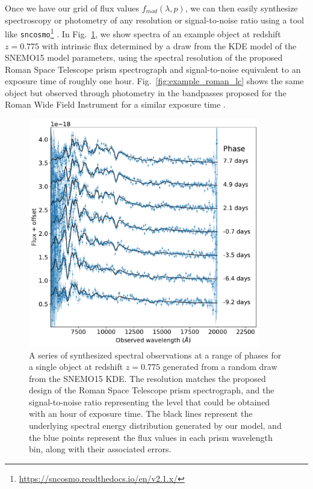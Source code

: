 Once we have our grid of flux values $f_{mod}(\lambda, p)$, we can then easily synthesize spectroscopy or photometry of any resolution or signal-to-noise ratio using a tool like \verb|sncosmo|\footnote{\url{https://sncosmo.readthedocs.io/en/v2.1.x/}} . In Fig.~\ref{fig:example_prism_spec}, we show spectra of an example object at redshift $z=0.775$ with intrinsic flux determined by a draw from the KDE model of the SNEMO15 model parameters, using the spectral resolution of the proposed Roman Space Telescope prism spectrograph and signal-to-noise equivalent to an exposure time of roughly one hour. Fig.~\ref{fig:example_roman_lc} shows the same object but observed through photometry in the bandpasses proposed for the Roman Wide Field Instrument for a similar exposure time \citep{rubin_evaluating_2020, roman_space_telescope_reference_information_roman_2019}. 

\begin{figure}
    \centering
    \includegraphics[width=0.9\textwidth]{figures/snemo_kde/example_roman_spec.pdf}
    \caption{A series of synthesized spectral observations at a range of phases for a single object at redshift $z=0.775$ generated from a random draw from the SNEMO15 KDE. The resolution matches the proposed design of the Roman Space Telescope prism spectrograph, and the signal-to-noise ratio representing the level that could be obtained with an hour of exposure time. The black lines represent the underlying spectral energy distribution generated by our model, and the blue points represent the flux values in each prism wavelength bin, along with their associated errors.}
    \label{fig:example_prism_spec}
\end{figure}

